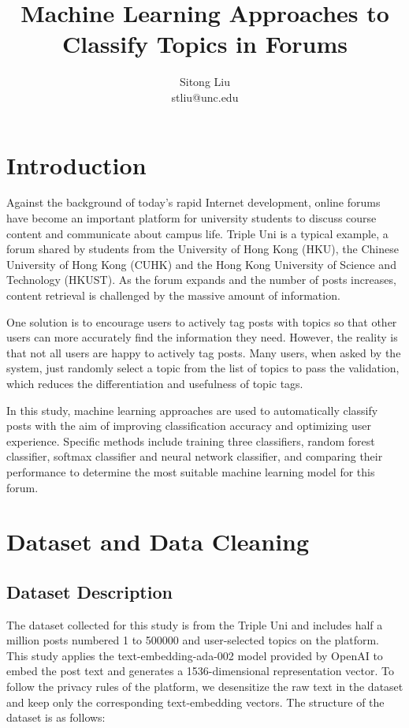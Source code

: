 \documentclass[a4paper, twocolumn]{article}
\date{}
\title{\textbf{Machine Learning Approaches to Classify Topics in Forums}}
\author{Sitong Liu \\ stliu@unc.edu}
\begin{document}
\maketitle

\section{Introduction}

Against the background of today's rapid Internet development, online forums have become an important platform for university students to discuss course content and communicate about campus life. Triple Uni is a typical example, a forum shared by students from the University of Hong Kong (HKU), the Chinese University of Hong Kong  (CUHK) and the Hong Kong University of Science and Technology (HKUST). As the forum expands and the number of posts increases, content retrieval is challenged by the massive amount of information.

One solution is to encourage users to actively tag posts with topics so that other users can more accurately find the information they need. However, the reality is that not all users are happy to actively tag posts. Many users, when asked by the system, just randomly select a topic from the list of topics to pass the validation, which reduces the differentiation and usefulness of topic tags.

In this study, machine learning approaches are used to automatically classify posts with the aim of improving classification accuracy and optimizing user experience. Specific methods include training three classifiers, random forest classifier, softmax classifier and neural network classifier, and comparing their performance to determine the most suitable machine learning model for this forum.

\section{Dataset and Data Cleaning}

\subsection{Dataset Description}

The dataset collected for this study is from the Triple Uni and includes half a million posts numbered 1 to 500000 and user-selected topics on the platform. This study applies the text-embedding-ada-002 model provided by OpenAI to embed the post text and generates a 1536-dimensional representation vector. To follow the privacy rules of the platform, we desensitize the raw text in the dataset and keep only the corresponding text-embedding vectors. The structure of the dataset is as follows:
\end{document}
